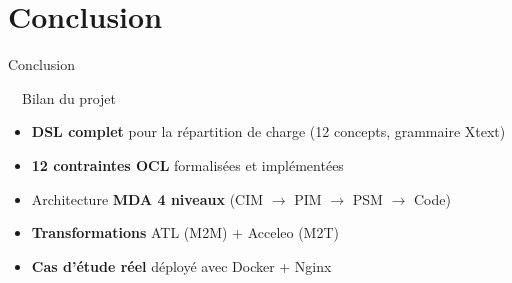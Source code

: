 \documentclass[aspectratio=169,12pt]{beamer}
\begin{document}
\section*{Conclusion}

\begin{frame}{Conclusion}
\begin{block}{\faFlagCheckered\ \ Bilan du projet}
\begin{itemize}
  \item \textbf{DSL complet} pour la répartition de charge (12 concepts, grammaire Xtext)
  \item \textbf{12 contraintes OCL} formalisées et implémentées
  \item Architecture \textbf{MDA 4 niveaux} (CIM $\rightarrow$ PIM $\rightarrow$ PSM $\rightarrow$ Code)
  \item \textbf{Transformations} ATL (M2M) + Acceleo (M2T)
  \item \textbf{Cas d'étude réel} déployé avec Docker + Nginx
\end{itemize}
\end{block}

\vspace{0.5em}
\begin{center}
\end{center}
\end{frame}
\end{document}
